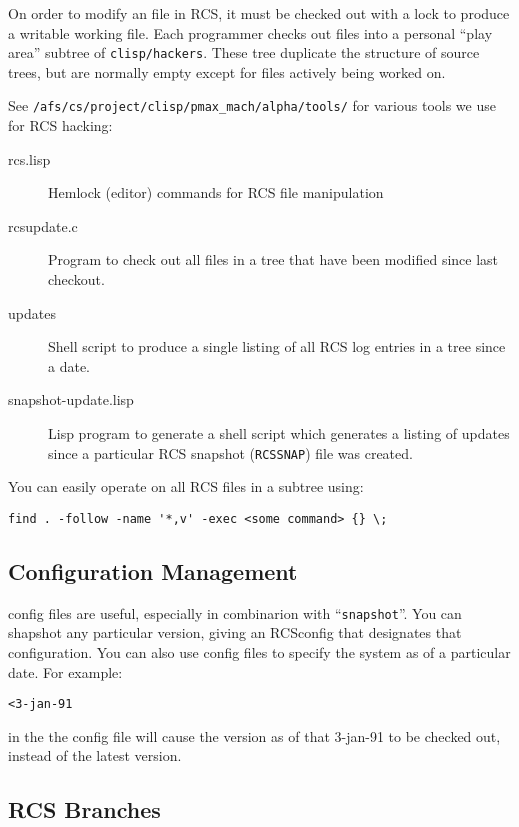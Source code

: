 On order to modify an file in RCS, it must be checked out with a lock to
produce a writable working file.  Each programmer checks out files into a
personal ``play area'' subtree of \verb|clisp/hackers|.  These tree duplicate
the structure of source trees, but are normally empty except for files actively
being worked on.

See \verb|/afs/cs/project/clisp/pmax_mach/alpha/tools/| for
various tools we use for RCS hacking:
\begin{description}
\item[rcs.lisp] Hemlock (editor) commands for RCS file manipulation

\item[rcsupdate.c] Program to check out all files in a tree that have been
modified since last checkout.

\item[updates] Shell script to produce a single listing of all RCS log
 entries in a tree since a date.

\item[snapshot-update.lisp] Lisp program to generate a shell script which
generates a listing of updates since a particular RCS snapshot ({\tt RCSSNAP})
file was created.
\end{description}

You can easily operate on all RCS files in a subtree using:
\begin{verbatim}
find . -follow -name '*,v' -exec <some command> {} \;
\end{verbatim}

\subsection{Configuration Management}

config files are useful, especially in combinarion with ``{\tt snapshot}''.  You
can shapshot any particular version, giving an RCSconfig that designates that
configuration.  You can also use config files to specify the system as of a
particular date.  For example:
\begin{verbatim}
<3-jan-91
\end{verbatim}
in the the config file will cause the version as of that 3-jan-91 to be checked
out, instead of the latest version.

\subsection{RCS Branches}

